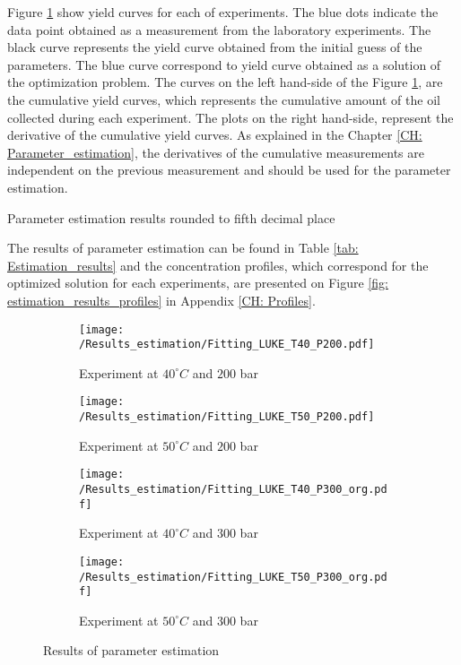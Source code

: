 \documentclass[../Article_Model_Parameters.tex]{subfiles}
\begin{document}
	Figure \ref{fig: estimation_results} show yield curves for each of experiments. The blue dots indicate the data point obtained as a measurement from the laboratory experiments. The black curve represents the yield curve obtained from the initial guess of the parameters. The blue curve correspond to yield curve obtained as a solution of the optimization problem. The curves on the left hand-side of the Figure \ref{fig: estimation_results}, are the cumulative yield curves, which represents the cumulative amount of the oil collected during each experiment. The plots on the right hand-side, represent the derivative of the cumulative yield curves. As explained in the Chapter \ref{CH: Parameter_estimation}, the derivatives of the cumulative measurements are independent on the previous measurement and should be used for the parameter estimation.

	\begin{table}[!h]
		\centering
		\caption{Parameter estimation results rounded to fifth decimal place}
		\label{tab: Estimation_results}
	\end{table}

	The results of parameter estimation can be found in Table \ref{tab: Estimation_results} and the concentration profiles, which correspond for the optimized solution for each experiments, are presented on Figure \ref{fig: estimation_results_profiles} in Appendix \ref{CH: Profiles}.
	
	\begin{figure}[!h]
		\centering
		\begin{subfigure}[b]{\columnwidth}
			\centering
			\texttt{[image: /Results\_estimation/Fitting\_LUKE\_T40\_P200.pdf]}
			\caption{Experiment at $40^\circ C$ and $200$ bar}
		\end{subfigure}
		\begin{subfigure}[b]{\columnwidth}
			\centering
			\texttt{[image: /Results\_estimation/Fitting\_LUKE\_T50\_P200.pdf]}
			\caption{Experiment at $50^\circ C$ and $200$ bar}
		\end{subfigure}
		\hfill
		\begin{subfigure}[b]{\columnwidth}
			\centering
			\texttt{[image: /Results\_estimation/Fitting\_LUKE\_T40\_P300\_org.pdf]}
			\caption{Experiment at $40^\circ C$ and $300$ bar}
		\end{subfigure}
		\begin{subfigure}[b]{\columnwidth}
			\centering
			\texttt{[image: /Results\_estimation/Fitting\_LUKE\_T50\_P300\_org.pdf]}
			\caption{Experiment at $50^\circ C$ and $300$ bar}
		\end{subfigure}
		\caption{Results of parameter estimation}
		\label{fig: estimation_results}
	\end{figure}
	
\end{document}
